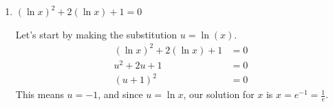 \documentclass{article}
\begin{document}
\begin{enumerate}
\begin{enumerate}
    \begin{solution}
      \begin{align*}
        2^{3x + 2} - 5^{2x + 7} &= 0 \\
        2^{3x+2} &= 5^{2x+7} \\ 
        \ln(2^{3x+2}) &= \ln(5^{2x+7}) \\
        (3x+2)\ln 2 &= (2x+7) \ln 5\\
        3x \ln 2 + 2 \ln 2 &= 2x\ln5 + 7\ln 5 \\
        3x\ln2 - 2x\ln 5 &= 7\ln 5 - 2\ln 2 \\
        (3\ln 2 - 2\ln 5)x &= 7\ln5 - 2\ln 2 \\
        x &= \frac{7\ln5 - 2\ln2}{3\ln2 - 2\ln5}
      \end{align*}
    \end{solution}

  \item \label{quadratic-in-ln-x}

    \begin{problem}[\stretch{0.5}]
      $(\ln x)^2 + 2 (\ln x) + 1 = 0$
    \end{problem}

    \begin{solution}
      Let's start by making the substitution $u=\ln(x)$.
      \begin{align*}
        (\ln x)^2 + 2 (\ln x) + 1 &= 0 \\
        u^2 + 2u + 1 &= 0 \\
        (u+1)^2 &= 0
      \end{align*}
      This means $u=-1$, and since $u=\ln x$, our solution for $x$
      is $x=e^{-1}=\tfrac{1}{e}$.
    \end{solution}

  \end{enumerate}

\end{enumerate}
\end{document}
